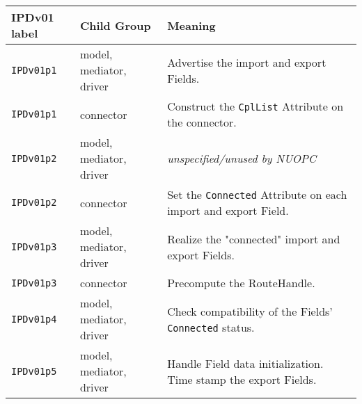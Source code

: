 \vspace*{3ex}
\begin{tabular}[h]{|p{35mm}|p{4cm}|p{6cm}|}
     \hline\hline
     {\bf IPDv01 label} & {\bf Child Group} & {\bf Meaning}\\
     \hline\hline
     {\tt IPDv01p1} & model, mediator, driver & Advertise the import and export Fields.\\ \hline
     {\tt IPDv01p1} & connector               & Construct the {\tt CplList} Attribute on the connector.\\ \hline
     {\tt IPDv01p2} & model, mediator, driver & {\em unspecified/unused by NUOPC}\\ \hline
     {\tt IPDv01p2} & connector               & Set the {\tt Connected} Attribute on each import and export Field.\\ \hline
     {\tt IPDv01p3} & model, mediator, driver & Realize the "connected" import and export Fields.\\ \hline
     {\tt IPDv01p3} & connector               & Precompute the RouteHandle.\\ \hline
     {\tt IPDv01p4} & model, mediator, driver & Check compatibility of the Fields' {\tt Connected} status.\\ \hline
     {\tt IPDv01p5} & model, mediator, driver & Handle Field data initialization. Time stamp the export Fields.\\
     \hline\hline
\end{tabular}\newline


